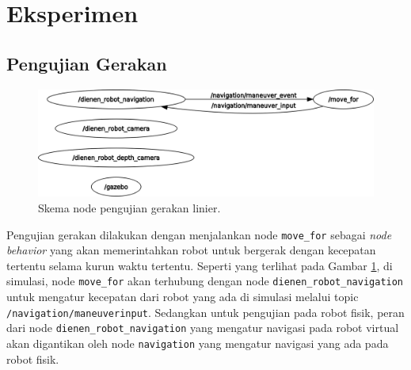 \section{Eksperimen}
\label{sec:eksperimen}

\subsection{Pengujian Gerakan}

\begin{figure} [ht]
  \centering
  \includegraphics[scale=0.25]{gambar/nodeujigerak.png}
  \caption{Skema node pengujian gerakan linier.}
  \label{fig:nodeujigerak}
\end{figure}

Pengujian gerakan dilakukan dengan menjalankan node \lstinline{move_for} sebagai \emph{node behavior} yang akan memerintahkan robot untuk bergerak dengan kecepatan tertentu selama kurun waktu tertentu.
Seperti yang terlihat pada Gambar \ref{fig:nodeujigerak}, di simulasi, node \lstinline{move_for} akan terhubung dengan node \lstinline{dienen_robot_navigation} untuk mengatur kecepatan dari robot yang ada di simulasi melalui topic \lstinline{/navigation/maneuverinput}.
Sedangkan untuk pengujian pada robot fisik, peran dari node \lstinline{dienen_robot_navigation} yang mengatur navigasi pada robot virtual akan digantikan oleh node \lstinline{navigation} yang mengatur navigasi yang ada pada robot fisik.

\lipsum[1-5]
